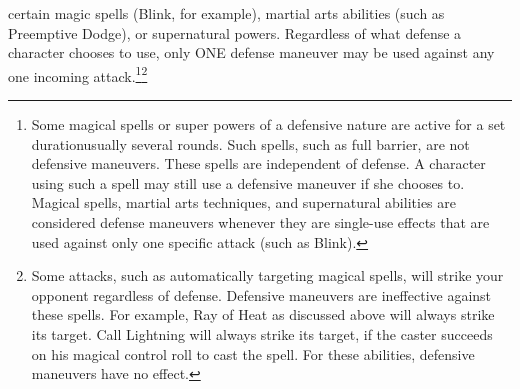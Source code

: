 \documentclass[twoside]{book}
\begin{document}
              certain magic spells (Blink, for example), martial arts
              abilities (such as Preemptive Dodge), or supernatural
              powers. Regardless of what defense a character chooses
              to use, only ONE defense maneuver may be used against
              any one incoming attack.\footnote{ Some magical spells or
              super powers of a defensive nature are active for a set
              durationusually several rounds. Such spells, such
              as full barrier, are not defensive maneuvers. These
              spells are independent of defense. A character using
              such a spell may still use a defensive maneuver if she
              chooses to.  Magical spells, martial arts techniques,
              and supernatural abilities are considered defense
              maneuvers whenever they are single-use effects that are
              used against only one specific attack (such as
              Blink).}\footnote{ Some attacks, such as
              automatically targeting magical spells, will strike your
              opponent regardless of defense. Defensive maneuvers are
              ineffective against these spells. For example, Ray of
              Heat as discussed above will always strike its
              target. Call Lightning will always strike its target, if
              the caster succeeds on his magical control roll to cast
              the spell. For these abilities, defensive maneuvers have
              no effect. }
            
    
\end{document}

